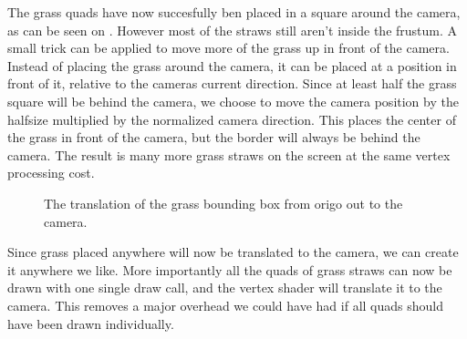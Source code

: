 

The grass quads have now succesfully ben placed in a square around the
camera, as can be seen on . However most
of the straws still aren't inside the frustum. A small trick can be
applied to move more of the grass up in front of the camera. Instead
of placing the grass around the camera, it can be placed at a position
in front of it, relative to the cameras current direction. Since at
least half the grass square will be behind the camera, we choose to
move the camera position by the halfsize multiplied by the normalized
camera direction. This places the center of the grass in front of the
camera, but the border will always be behind the camera. The result is
many more grass straws on the screen at the same vertex processing
cost.

\begin{figure}
  \centering
  \caption{The translation of the grass bounding box from origo out to the camera.}
  \label{fig:grassTranslation}
\end{figure}



Since grass placed anywhere will now be translated to the camera, we
can create it anywhere we like. More importantly all the quads of
grass straws can now be drawn with one single draw call, and the
vertex shader will translate it to the camera. This removes a major
overhead we could have had if all quads should have been drawn
individually.

